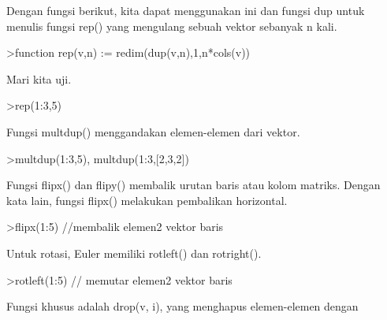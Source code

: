\documentclass[a4paper,10pt]{article}
\begin{document}
\begin{eulernotebook}
\begin{eulercomment}
\begin{eulercomment}
\begin{eulercomment}
\begin{eulercomment}
\begin{euleroutput}
\end{euleroutput}
\begin{eulercomment}
Dengan fungsi berikut, kita dapat menggunakan ini dan fungsi dup untuk
menulis fungsi rep() yang mengulang sebuah vektor sebanyak n kali.
\end{eulercomment}
\begin{eulerprompt}
>function rep(v,n) := redim(dup(v,n),1,n*cols(v))
\end{eulerprompt}
\begin{eulercomment}
Mari kita uji.
\end{eulercomment}
\begin{eulerprompt}
>rep(1:3,5)
\end{eulerprompt}
\begin{euleroutput}
  [1,  2,  3,  1,  2,  3,  1,  2,  3,  1,  2,  3,  1,  2,  3]
\end{euleroutput}
\begin{eulercomment}
Fungsi multdup() menggandakan elemen-elemen dari vektor.
\end{eulercomment}
\begin{eulerprompt}
>multdup(1:3,5), multdup(1:3,[2,3,2])
\end{eulerprompt}
\begin{euleroutput}
  [1,  1,  1,  1,  1,  2,  2,  2,  2,  2,  3,  3,  3,  3,  3]
  [1,  1,  2,  2,  2,  3,  3]
\end{euleroutput}
\begin{eulercomment}
Fungsi flipx() dan flipy() membalik urutan baris atau kolom matriks.
Dengan kata lain, fungsi flipx() melakukan pembalikan horizontal.
\end{eulercomment}
\begin{eulerprompt}
>flipx(1:5) //membalik elemen2 vektor baris
\end{eulerprompt}
\begin{euleroutput}
  [5,  4,  3,  2,  1]
\end{euleroutput}
\begin{eulercomment}
Untuk rotasi, Euler memiliki rotleft() dan rotright().
\end{eulercomment}
\begin{eulerprompt}
>rotleft(1:5) // memutar elemen2 vektor baris
\end{eulerprompt}
\begin{euleroutput}
  [2,  3,  4,  5,  1]
\end{euleroutput}
\begin{eulercomment}
Fungsi khusus adalah drop(v, i), yang menghapus elemen-elemen dengan

\end{eulercomment}
\end{eulercomment}
\end{eulercomment}
\end{eulercomment}
\end{eulercomment}
\end{eulernotebook}
\end{document}
